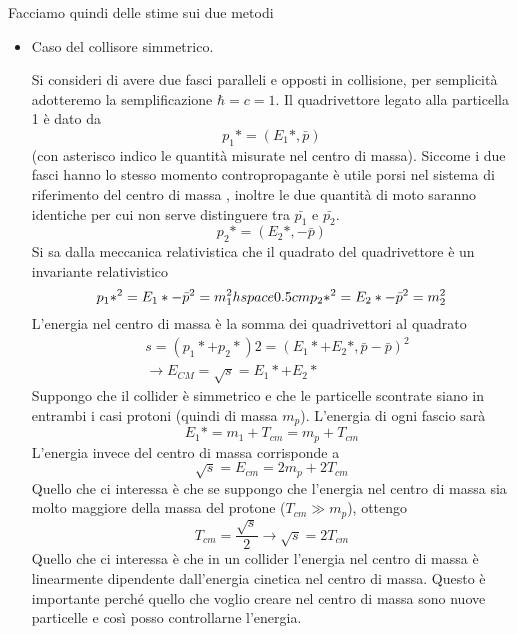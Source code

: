 Facciamo quindi delle stime sui due metodi
\begin{itemize}
\item Caso del collisore simmetrico.

Si consideri di avere due fasci paralleli e opposti in collisione, per semplicità adotteremo la semplificazione $\hbar=c=1$.
Il quadrivettore legato alla particella 1 è dato da
\begin{equation}
p_1*=(E_1*,\bar{p})
\end{equation}
(con asterisco indico le quantità misurate nel centro di massa).
Siccome i due fasci hanno lo stesso momento contropropagante è utile porsi nel sistema di riferimento del centro di massa , inoltre le due quantità di moto saranno identiche per cui non serve distinguere tra $\bar{p_1}$ e $\bar{p_2}$.
\begin{equation}
p_2*=(E_2*,-\bar{p})
\end{equation}
Si sa dalla meccanica relativistica che il quadrato del quadrivettore è un invariante relativistico
\begin{equation}
{p_1*}^2=E_1*-\bar{p}^2=m_1^2\\hspace{0.5cm}{p_2*}^2=E_2*-\bar{p}^2=m_2^2
\end{equation}
L'energia nel centro di massa è la somma dei quadrivettori al quadrato
\begin{equation}
\begin{split}
&s=(p_1*+p_2*)2=(E_1*+E_2*, \bar{p}-\bar{p})^2\\
&\to E_{CM}=\sqrt{s}=E_1*+E_2*
\end{split}
\end{equation}
Suppongo che il collider è simmetrico e che le particelle scontrate siano in entrambi i casi protoni (quindi di massa $m_p$).
L'energia di ogni fascio sarà
\begin{equation}
E_1*=m_1+T_{cm}=m_p+T_{cm}
\end{equation}
L'energia invece del centro di massa corrisponde a 
\begin{equation}
\sqrt{s}=E_{cm}=2m_p+2T_{cm}
\end{equation}
Quello che ci interessa è che se suppongo che l'energia nel centro di massa sia molto maggiore della massa del protone ($T_{cm}\gg m_p$), ottengo
\begin{equation}
T_{cm}=\frac{\sqrt{s}}{2}\to \sqrt{s}=2T_{cm}
\end{equation}
Quello che ci interessa è che in un collider l'energia nel centro di massa è linearmente dipendente dall'energia cinetica nel centro di massa.
Questo è importante perché quello che voglio creare nel centro di massa sono nuove particelle e così posso controllarne l'energia.


\end{itemize}

